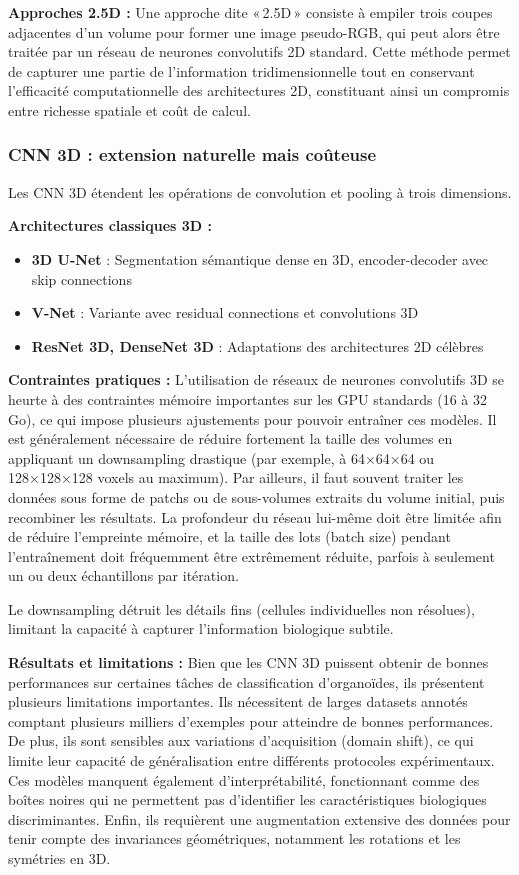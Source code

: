 \textbf{Approches 2.5D :}
Une approche dite « 2.5D » consiste à empiler trois coupes adjacentes d’un volume pour former une image pseudo-RGB, qui peut alors être traitée par un réseau de neurones convolutifs 2D standard. Cette méthode permet de capturer une partie de l’information tridimensionnelle tout en conservant l’efficacité computationnelle des architectures 2D, constituant ainsi un compromis entre richesse spatiale et coût de calcul.

\subsubsection{CNN 3D : extension naturelle mais coûteuse}

Les CNN 3D étendent les opérations de convolution et pooling à trois dimensions.

\textbf{Architectures classiques 3D :}
\begin{itemize}
    \item \textbf{3D U-Net} : Segmentation sémantique dense en 3D, encoder-decoder avec skip connections
    \item \textbf{V-Net} : Variante avec residual connections et convolutions 3D
    \item \textbf{ResNet 3D, DenseNet 3D} : Adaptations des architectures 2D célèbres
\end{itemize}

\textbf{Contraintes pratiques :}
L’utilisation de réseaux de neurones convolutifs 3D se heurte à des contraintes mémoire importantes sur les GPU standards (16 à 32 Go), ce qui impose plusieurs ajustements pour pouvoir entraîner ces modèles. Il est généralement nécessaire de réduire fortement la taille des volumes en appliquant un downsampling drastique (par exemple, à 64×64×64 ou 128×128×128 voxels au maximum). Par ailleurs, il faut souvent traiter les données sous forme de patchs ou de sous-volumes extraits du volume initial, puis recombiner les résultats. La profondeur du réseau lui-même doit être limitée afin de réduire l’empreinte mémoire, et la taille des lots (batch size) pendant l’entraînement doit fréquemment être extrêmement réduite, parfois à seulement un ou deux échantillons par itération.

Le downsampling détruit les détails fins (cellules individuelles non résolues), limitant la capacité à capturer l'information biologique subtile.

\textbf{Résultats et limitations :}
Bien que les CNN 3D puissent obtenir de bonnes performances sur certaines tâches de classification d'organoïdes, ils présentent plusieurs limitations importantes. Ils nécessitent de larges datasets annotés comptant plusieurs milliers d'exemples pour atteindre de bonnes performances. De plus, ils sont sensibles aux variations d'acquisition (domain shift), ce qui limite leur capacité de généralisation entre différents protocoles expérimentaux. Ces modèles manquent également d'interprétabilité, fonctionnant comme des boîtes noires qui ne permettent pas d'identifier les caractéristiques biologiques discriminantes. Enfin, ils requièrent une augmentation extensive des données pour tenir compte des invariances géométriques, notamment les rotations et les symétries en 3D.

